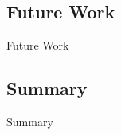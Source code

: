\subsection{Future Work}
\begin{frame}{Future Work}
\end{frame}

\subsection{Summary}
\begin{frame}{Summary}
\end{frame}